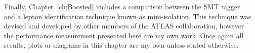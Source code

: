 
Finally, Chapter~\ref{ch:Boosted} includes a comparison between the SMT tagger and a lepton identification technique known as mini-isolation. This technique was devised and developed by other members of the ATLAS collaboration, however the performance measurement presented here are my own work. Once again all results, plots or diagrams in this chapter are my own unless stated otherwise.
